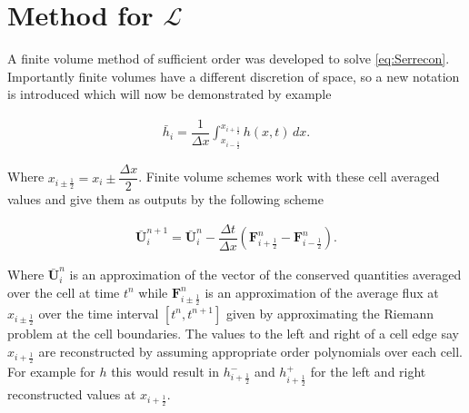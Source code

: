 \documentclass[SingleSpace,12pt]{Serre_ASCE}
\begin{document}
\section{Method for $\mathcal{L}$}
A finite volume method of sufficient order was developed to solve \eqref{eq:Serrecon}. Importantly finite volumes have a different discretion of space, so a new notation is introduced which will now be demonstrated by example
\begin{linenomath*}
\begin{gather*}
\bar{h}_i = \dfrac{1}{\Delta x} \int_{x_{i-\frac{1}{2}}}^{x_{i+\frac{1}{2}}} h(x,t) \, dx .
\end{gather*}
\end{linenomath*}
Where $x_{i \pm \frac{1}{2}} = x_i \pm \dfrac{\Delta x}{2}$. Finite volume schemes work with these cell averaged values and give them  as outputs by the following scheme
\begin{linenomath*}
\begin{gather*}
\boldsymbol{\bar{U}}^{n+1}_i = \boldsymbol{\bar{U}}^{n}_i - \dfrac{\Delta t}{\Delta x} \left(\boldsymbol{F}^n_{i+ \frac{1}{2}} - \boldsymbol{F}^n_{i - \frac{1}{2}} \right).
\end{gather*}
\end{linenomath*}
Where $\boldsymbol{\bar{U}}^{n}_i$ is an approximation of the vector of the conserved quantities averaged over the cell at time $t^n$ while $\boldsymbol{F}^n_{i\pm \frac{1}{2}}$ is an approximation of the average flux at $x_{i \pm \frac{1}{2} }$ over the time interval $\left[t^n, t^{n+1}\right]$ given by approximating the Riemann problem at the cell boundaries. The values to the left and right of a cell edge say $x_{i + \frac{1}{2}}$ are reconstructed by assuming appropriate order polynomials over each cell. For example for $h$ this would result in $h^-_{i + \frac{1}{2}}$ and $h^+_{i + \frac{1}{2}}$ for the left and right reconstructed values at $x_{i + \frac{1}{2} }$.
\end{document}
